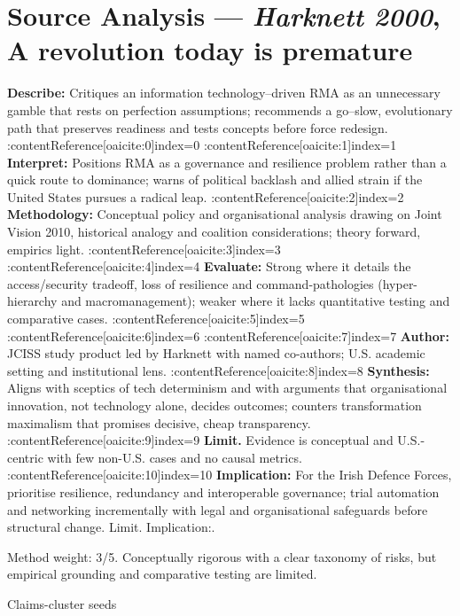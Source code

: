 \parencite{HARK_2000}

\section*{Source Analysis — \textit{Harknett 2000}, A revolution today is premature}
\textbf{Describe:} Critiques an information technology--driven RMA as an unnecessary gamble that rests on perfection assumptions; recommends a go--slow, evolutionary path that preserves readiness and tests concepts before force redesign. {\small :contentReference[oaicite:0]{index=0} :contentReference[oaicite:1]{index=1}}
\textbf{Interpret:} Positions RMA as a governance and resilience problem rather than a quick route to dominance; warns of political backlash and allied strain if the United States pursues a radical leap. {\small :contentReference[oaicite:2]{index=2}}
\textbf{Methodology:} Conceptual policy and organisational analysis drawing on Joint Vision 2010, historical analogy and coalition considerations; theory forward, empirics light. {\small :contentReference[oaicite:3]{index=3} :contentReference[oaicite:4]{index=4}}
\textbf{Evaluate:} Strong where it details the access/security tradeoff, loss of resilience and command-pathologies (hyper-hierarchy and macromanagement); weaker where it lacks quantitative testing and comparative cases. {\small :contentReference[oaicite:5]{index=5} :contentReference[oaicite:6]{index=6} :contentReference[oaicite:7]{index=7}}
\textbf{Author:} JCISS study product led by Harknett with named co-authors; U.S. academic setting and institutional lens. {\small :contentReference[oaicite:8]{index=8}}
\textbf{Synthesis:} Aligns with sceptics of tech determinism and with arguments that organisational innovation, not technology alone, decides outcomes; counters transformation maximalism that promises decisive, cheap transparency. {\small :contentReference[oaicite:9]{index=9}}
\textbf{Limit.} Evidence is conceptual and U.S.-centric with few non-U.S. cases and no causal metrics. {\small :contentReference[oaicite:10]{index=10}}
\textbf{Implication:} For the Irish Defence Forces, prioritise resilience, redundancy and interoperable governance; trial automation and networking incrementally with legal and organisational safeguards before structural change. Limit. Implication:.

Method weight: 3/5. Conceptually rigorous with a clear taxonomy of risks, but empirical grounding and comparative testing are limited.

Claims-cluster seeds

